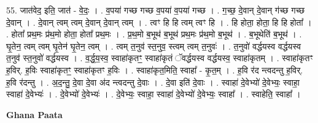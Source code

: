 \documentclass[17pt]{extarticle}
\begin{document}
55. जात॑वेद॒ इति॒ जात॑ - वे॒दः॒ । . व॒पया॑ गच्छ गच्छ व॒पया॑ व॒पया॑ गच्छ । . ग॒च्छ॒ दे॒वान् दे॒वान् ग॑च्छ गच्छ दे॒वान् । . दे॒वान् त्वम् त्वम् दे॒वान् दे॒वान् त्वम् । . त्वꣳ हि हि त्वम् त्वꣳ हि । . हि होता॒ होता॒ हि हि होता᳚ । . होता᳚ प्रथ॒मः प्र॑थ॒मो होता॒ होता᳚ प्रथ॒मः । . प्र॒थ॒मो ब॒भूथ॑ ब॒भूथ॑ प्रथ॒मः प्र॑थ॒मो ब॒भूथ॑ । . ब॒भूथेति॑ ब॒भूथ॑ । . घृ॒तेन॒ त्वम् त्वम् घृ॒तेन॑ घृ॒तेन॒ त्वम् । . त्वम् त॒नुव॑ स्त॒नुव॒ स्त्वम् त्वम् त॒नुवः॑ । . त॒नुवो॑ वर्द्धयस्व वर्द्धयस्व त॒नुव॑ स्त॒नुवो॑ वर्द्धयस्व । . व॒र्द्ध॒य॒स्व॒ स्वाहा॑कृतꣳ॒॒ स्वाहा॑कृतं ॅवर्द्धयस्व वर्द्धयस्व॒ स्वाहा॑कृतम् । . स्वाहा॑कृतꣳ ह॒विर्. ह॒विः स्वाहा॑कृतꣳ॒॒ स्वाहा॑कृतꣳ ह॒विः । . स्वाहा॑कृत॒मिति॒ स्वाहा᳚ - कृ॒त॒म् । . ह॒वि र॑द न्त्वदन्तु ह॒विर्. ह॒वि र॑दन्तु । . अ॒द॒न्तु॒ दे॒वा दे॒वा अ॑द न्त्वदन्तु दे॒वाः । . दे॒वा इति॑ दे॒वाः । . स्वाहा॑ दे॒वेभ्यो॑ दे॒वेभ्यः॒ स्वाहा॒ स्वाहा॑ दे॒वेभ्यः॑ । . दे॒वेभ्यो॑ दे॒वेभ्यः॑ । . दे॒वेभ्यः॒ स्वाहा॒ स्वाहा॑ दे॒वेभ्यो॑ दे॒वेभ्यः॒ स्वाहा᳚ । . स्वाहेति॒ स्वाहा᳚ । \newline

\textbf{Ghana Paata } \newline
\end{document}
